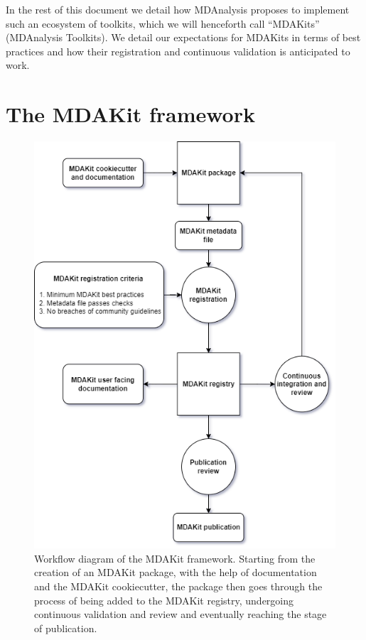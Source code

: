 \documentclass[9pt,whitepaper]{livecoms}
\begin{document}
In the rest of this document we detail how MDAnalysis proposes to implement such an ecosystem of toolkits, which we will henceforth call “MDAKits” (MDAnalysis Toolkits). We detail our expectations for MDAKits in terms of best practices and how their registration and continuous validation is anticipated to work.

\section{The MDAKit framework}
\label{sec:mdakitframework}

\begin{figure}[hbt!]
    \centering
    \includegraphics[width=\linewidth]{figures/MDAKitFramework.png}
    \caption{Workflow diagram of the MDAKit framework. Starting from the creation of an MDAKit package, with the help of documentation and the MDAKit cookiecutter, the package then goes through the process of being added to the MDAKit registry, undergoing continuous validation and review and eventually reaching the stage of publication.}
    \label{fig:workflow}
\end{figure}
\end{document}
